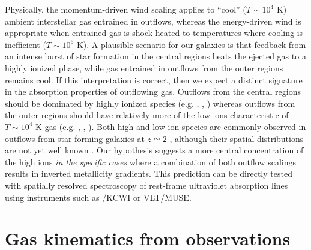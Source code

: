 Physically, the momentum-driven wind scaling applies to ``cool'' ($T \sim 10^4$ K) ambient interstellar gas entrained in outflows,
whereas the energy-driven wind is appropriate when entrained gas is shock heated to temperatures where cooling is inefficient ($T
\sim 10^6$ K). A plausible scenario for our galaxies is that feedback from an intense burst of star formation in the central
regions heats the ejected gas to a highly ionized phase, while gas entrained in outflows from the outer regions remains cool. If
this interpretation is correct, then we expect a distinct signature in the absorption properties of outflowing gas. Outflows from
the central regions should be dominated by highly ionized species (e.g. , , ) whereas
outflows from the outer regions should have relatively more of the low ions characteristic of $T \sim 10^4$ K gas (e.g.
, , ). Both high and low ion species are commonly observed in outflows from star forming
galaxies at $z\simeq2$ \citep{Berg:2018gd,Du:2018tr}, although their spatial distributions are not yet well known 
\citep[but see][]{James:2018km}.
Our hypothesis suggests a more central concentration of the high ions \emph{in the specific cases} where a 
combination of both outflow scalings results in inverted metallicity gradients.
This prediction can be directly tested with spatially resolved spectroscopy of rest-frame
ultraviolet absorption lines using instruments such as \keck/KCWI or VLT/MUSE.

\setcounter{section}{0}
\renewcommand{\thesection}{\thechapter.\Alph{section}}

\section{Gas kinematics from \keck \osiris observations}\label{sect:kinem}

